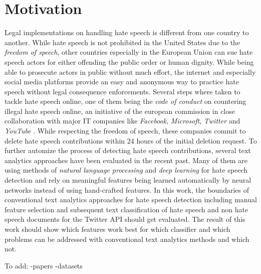 \section{Motivation}

Legal implementations on handling hate speech is different from one country to another. While hate speech is not prohibited in the United States due to the \textit{freedom of speech}, other countries especially in the European Union can sue hate speech actors for either offending the public order or human dignity. While being able to prosecute actors in public without much effort, the internet and especially social media platforms provide an easy and anonymous way to practice hate speech without legal consequence enforcements. Several steps where taken to tackle hate speech online, one of them being the \textit{code of conduct} on countering illegal hate speech online, an initiative of the european commission in close collaboration with major IT companies like \textit{Facebook}, \textit{Microsoft}, \textit{Twitter} and \textit{YouTube} \cite{EuropeanCommission.20200622}. While respecting the freedom of speech, these companies commit to delete hate speech contributions within 24 hours of the initial deletion request. To further automize the process of detecting hate speech contributions, several text analytics approaches have been evaluated in the recent past. Many of them are using methods of \textit{natural language processing} and \textit{deep learning} for hate speech detection and rely on meaningful features being learned automatically by neural networks instead of using hand-crafted features. In this work, the boundaries of conventional text analytics approaches for hate speech detection including manual feature selection and subsequent text classification of hate speech and non hate speech documents for the Twitter API should get evaluated. The result of this work should show which features work best for which classifier and which problems can be addressed with conventional text analytics methods and which not. 

To add:
-papers
-datasets